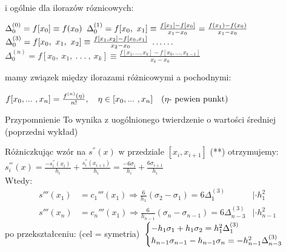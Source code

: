     \begin{frame}
    	i ogólnie dla ilorazów róznicowych:
        \begin{flushright}
        	$\Delta_{0}^{(0)}=f[x_{0}]\equiv f(x_{0}) \linebreak \linebreak$
            $\Delta_{0}^{(1)}=f[x_{0},\ x_{1}]\equiv\frac{f[x_{1}]-f[x_{0}]}{x_{1}-
            x_{0}}=\frac{f(x_{1})-f(x_{0})}{x_{1}-x_{0}} 
            \linebreak \linebreak$
            $\Delta_{0}^{(3)}=f[x_{0},\ x_{1},\ x_{2}]\equiv\frac{f[x_{1},x_{2}]-f[x_{0},x_{1}]}
            {x_{2}-x_{0}} \linebreak $
            $\ldots \ldots \linebreak$
            $\Delta_{0}^{(n)}=f[x_{0},\ x_{1},\ .\ .\ .\ ,\ x_{k}]\equiv\frac{f[x_{1},\ldots,x_{k}]-f[x_{0},\ldots,x_{k-1}]}{x_{k}-x_{0}}$
        \end{flushright}
        mamy związek między ilorazami różnicowymi a pochodnymi:
        \begin{exampleblock}{}
        	$
            	\centering f[x_{0}, ... \ , x_{n}]=\frac{f^{(n)}(\eta)}
                {n!}, \ \ \ \eta \in [x_{0},... \ , x_{n}]
                \ \ \ (\eta \textrm{- pewien punkt})
            $
        \end{exampleblock}
        \begin{block}{Przypomnienie}
         To wynika z 	uogólnionego  twierdzenie o wartości średniej (poprzedni wykład) 
        \end{block}
        
    \end{frame}
    \begin{frame}
    	Różniczkując wzór na $s^{''}(x)$ w przedziale $[x_{i},x_{i+1}] $ (**) otrzymujemy:
        $s_i^{'''}(x)=\frac{-s_i^{''}(x_i)}{h_i}+\frac{s_i^{''}(x_{i+1})}{h_i}=\frac{-6\sigma_{i}}{h_i}+\frac{6\sigma_{i+1}}{h_i}$\\
        Wtedy:
        \begin{align*}
        	s'''(x_{1})&=c_{1}'''(x_{1}) \Rightarrow
            \frac{6}{h_{1}}(\sigma_{2}-\sigma_{1})=6\Delta_{1}^{(3)}
            &|\cdot h_{1}^{2}
            \\
            s'''(x_{n})&=c_{n}'''(x_{1}) \Rightarrow
            \frac{6}{h_{n-1}}(\sigma_{n}-\sigma_{n-1})=6\Delta_{n-3}^{(3)}
            &|\cdot h_{n-1}^{2}
        \end{align*}
        po przekształceniu: (cel = symetria)
        $\newline \newline
        \begin{cases}
        	-h_{1}\sigma_{1}+h_{1}\sigma_{2}=h_{1}^{2}\Delta_{1}^{(3)}
            \\
		h_{n-1}\sigma_{n-1}-h_{n-1}\sigma_{n}=-h_{n-1}^{2}\Delta_{n-3}^{(3)}
        \end{cases}
        $
    \end{frame}
